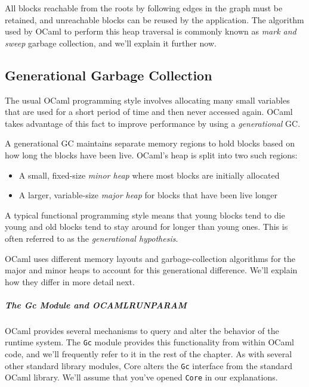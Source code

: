 All blocks reachable from the roots by following edges in the graph must
be retained, and unreachable blocks can be reused by the application.
The algorithm used by OCaml to perform this heap traversal is commonly
known as \emph{mark and sweep} garbage collection, and we'll explain it
further now.

\hypertarget{generational-garbage-collection}{%
\subsection{Generational Garbage
Collection}\label{generational-garbage-collection}}

The usual OCaml programming style involves allocating many small
variables that are used for a short period of time and then never
accessed again. OCaml takes advantage of this fact to improve
performance by using a \emph{generational} GC.

A generational GC maintains separate memory regions to hold blocks based
on how long the blocks have been live. OCaml's heap is split into two
such regions: 

\begin{itemize}
\item
  A small, fixed-size \emph{minor heap} where most blocks are initially
  allocated
\item
  A larger, variable-size \emph{major heap} for blocks that have been
  live longer
\end{itemize}

A typical functional programming style means that young blocks tend to
die young and old blocks tend to stay around for longer than young ones.
This is often referred to as the \emph{generational hypothesis}.

OCaml uses different memory layouts and garbage-collection algorithms
for the major and minor heaps to account for this generational
difference. We'll explain how they differ in more detail next.

\hypertarget{the-gc-module-and-ocamlrunparam}{%
\subparagraph{The Gc Module and
OCAMLRUNPARAM}\label{the-gc-module-and-ocamlrunparam}}

OCaml provides several mechanisms to query and alter the behavior of the
runtime system. The \passthrough{\lstinline!Gc!} module provides this
functionality from within OCaml code, and we'll frequently refer to it
in the rest of the chapter. As with several other standard library
modules, Core alters the \passthrough{\lstinline!Gc!} interface from the
standard OCaml library. We'll assume that you've opened
\passthrough{\lstinline!Core!} in our explanations.

